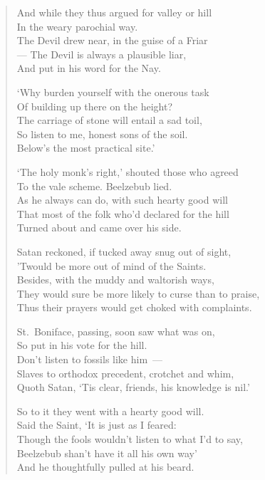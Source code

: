 \documentclass[
  12pt,
  a5paper,
  twoside]{book}
\begin{document}
\begin{quote}
And while they thus argued for valley or hill\\
In the weary parochial way.\\
The Devil drew near, in the guise of a Friar\\
--- The Devil is always a plausible liar,\\
And put in his word for the Nay.

`Why burden yourself with the onerous task\\
Of building up there on the height?\\
The carriage of stone will entail a sad toil,\\
So listen to me, honest sons of the soil.\\
Below's the most practical site.'

`The holy monk's right,' shouted those who agreed\\
To the vale scheme. Beelzebub lied.\\
As he always can do, with such hearty good will\\
That most of the folk who'd declared for the hill\\
Turned about and came over his side.

Satan reckoned, if tucked away snug out of sight,\\
'Twould be more out of mind of the Saints.\\
Besides, with the muddy and waltorish ways,\\
They would sure be more likely to curse than to praise,\\
Thus their prayers would get choked with complaints.

St.~Boniface, passing, soon saw what was on,\\
So put in his vote for the hill.\\
Don't listen to fossils like him~---\\
Slaves to orthodox precedent, crotchet and whim,\\
Quoth Satan, `Tis clear, friends, his knowledge is nil.'

So to it they went with a hearty good will.\\
Said the Saint, `It is just as I feared:\\
Though the fools wouldn't listen to what I'd to say,\\
Beelzebub shan't have it all his own way'\\
And he thoughtfully pulled at his beard.
\end{quote}
\end{document}
